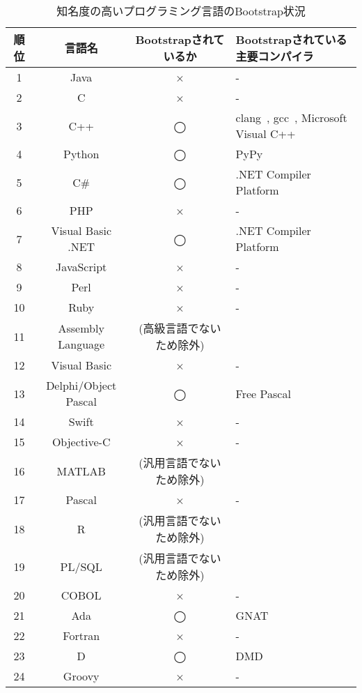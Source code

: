 \begin{table}[hb]
    \begin{center}
        \caption{知名度の高いプログラミング言語のBootstrap状況}
        \begin{tabular}{|c|c|c|m{4.5cm}|}
            \hline
            順位 & 言語名 & Bootstrapされているか & Bootstrapされている主要コンパイラ\\
            \hline
            1 & Java & × & -\\
            \hline
            2 & C & × & -\\
            \hline
            3 & C++ & ◯ & clang~\cite{clang}, gcc~\cite{gcc}, Microsoft Visual C++~\cite{vcpp}\\
            \hline
            4 & Python & ◯ & PyPy~\cite{pypy}\\
            \hline
            5 & C\# & ◯ & .NET Compiler Platform~\cite{roslyn}\\
            \hline
            6 & PHP & × & - \\
            \hline
            7 & Visual Basic .NET & ◯ & .NET Compiler Platform~\cite{roslyn}\\
            \hline
            8 & JavaScript & × & -\\
            \hline
            9 & Perl & × & -\\
            \hline
            10 & Ruby & × & -\\
            \hline
            11 & Assembly Language & (高級言語でないため除外) &\\
            \hline
            12 & Visual Basic & × & -\\
            \hline
            13 & Delphi/Object Pascal & ◯ & Free Pascal~\cite{free-pascal}\\
            \hline
            14 & Swift & × & -\\
            \hline
            15 & Objective-C & × & -\\
            \hline
            16 & MATLAB & (汎用言語でないため除外) &\\
            \hline
            17 & Pascal & × & -\\
            \hline
            18 & R & (汎用言語でないため除外) &\\
            \hline
            19 & PL/SQL & (汎用言語でないため除外) &\\
            \hline
            20 & COBOL & × & -\\
            \hline
            21 & Ada & ◯ & GNAT~\cite{gnat}\\
            \hline
            22 & Fortran & × & -\\
            \hline
            23 & D & ◯ & DMD~\cite{dmd}\\
            \hline
            24 & Groovy & × & -\\
            \hline
        \end{tabular}
        \label{table:bootstrapping-languages}
    \end{center}
\end{table}

